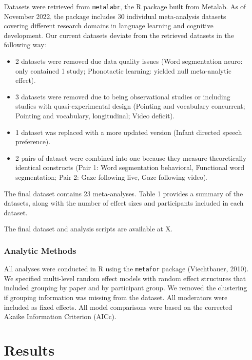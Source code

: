 \documentclass[10pt, letterpaper]{article}
\begin{document}
Datasets were retrieved from \texttt{metalabr}, the R package built from
Metalab. As of November 2022, the package includes 30 individual
meta-analysis datasets covering different research domains in language
learning and cognitive development. Our current datasets deviate from
the retrieved datasets in the following way:

\begin{itemize}
\item 2 datasets were removed due data quality issues (Word segmentation neuro: only contained 1 study; Phonotactic learning: yielded null meta-analytic effect).
\item 3 datasets were removed due to being observational studies or including studies with quasi-experimental design (Pointing and vocabulary concurrent; Pointing and vocabulary, longitudinal; Video deficit).
\item 1 dataset was replaced with a more updated version (Infant directed speech preference).
\item 2 pairs of dataset were combined into one because they measure theoretically identical constructs (Pair 1: Word segmentation behavioral, Functional word segmentation; Pair 2: Gaze following live, Gaze following video). 
\end{itemize}

The final dataset contains 23 meta-analyses. Table 1 provides a summary
of the datasets, along with the number of effect sizes and participants
included in each dataset.

The final dataset and analysis scripts are available at X.

\hypertarget{analytic-methods}{%
\subsubsection{Analytic Methods}\label{analytic-methods}}

All analyses were conducted in R using the \texttt{metafor} package
(Viechtbauer, 2010). We specified multi-level random effect models with
random effect structures that included grouping by paper and by
participant group. We removed the clustering if grouping information was
missing from the dataset. All moderators were included as fixed effects.
All model comparisons were based on the corrected Akaike Information
Criterion (AICc).

\hypertarget{results}{%
\section{Results}\label{results}}
\end{document}
